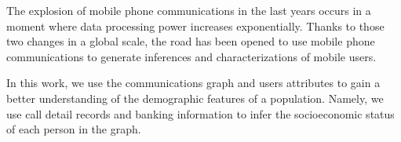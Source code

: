 The explosion of mobile phone communications in the last years occurs in a moment where data processing power increases exponentially.  Thanks to those two changes in a global scale, the road has been opened to use mobile phone communications to generate inferences and characterizations of mobile users.

In this work, we use the communications graph and users attributes to gain a better understanding of the demographic features of a population. Namely, we use 
call detail records and banking information to infer the socioeconomic status of each person in the graph.

